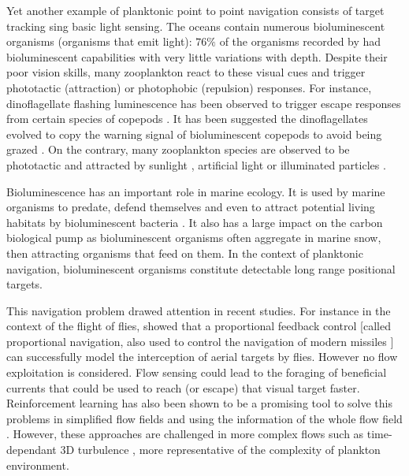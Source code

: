 Yet another example of planktonic point to point navigation consists of target tracking sing basic light sensing.
The oceans contain numerous bioluminescent organisms (organisms that emit light): $76\%$ of the organisms recorded by \citet{martini2017quantification} had bioluminescent capabilities with very little variations with depth.
Despite their poor vision skills, many zooplankton react to these visual cues and trigger phototactic (attraction) or photophobic (repulsion) responses.
For instance, dinoflagellate flashing luminescence has been observed to trigger escape responses from certain species of copepods \citep{buskey1983behavioral}.
It has been suggested the dinoflagellates evolved to copy the warning signal of bioluminescent copepods to avoid being grazed \citep{buskey1985behavioral}.
On the contrary, many zooplankton species are observed to be phototactic and attracted by sunlight \citep{ringelberg1999photobehaviour}, artificial light \citep{jekely2008mechanism, krafft2021antarctic, stearns1984photosensitivity} or illuminated particles \citep{tanaka2019biased}.

Bioluminescence has an important role in marine ecology. 
It is used by marine organisms to predate, defend themselves and even to attract potential living habitats by bioluminescent bacteria  \citep{haddock2010bioluminescence}.
It also has a large impact on the carbon biological pump as bioluminescent organisms often aggregate in marine snow, then attracting organisms that feed on them.
In the context of planktonic navigation, bioluminescent organisms constitute detectable long range positional targets.

This navigation problem drawed attention in recent studies. For instance in the context of the flight of flies, \citet{fabian2018interception} showed that a proportional feedback control [called proportional navigation, also used to control the navigation of modern missiles \citep{shneydor1998missile}] can successfully model the interception of aerial targets by flies.
However no flow exploitation is considered.
Flow sensing could lead to the foraging of beneficial currents that could be used to reach (or escape) that visual target faster.
Reinforcement learning has also been shown to be a promising tool to solve this problems in simplified flow fields \citep{gunnarson2021learning} and using the information of the whole flow field \citep{biferale2019zermelo}.
However, these approaches are challenged in more complex flows such as time-dependant 3D turbulence \citep{alageshan2020machine, qiu2022active}, more representative of the complexity of plankton environment.

